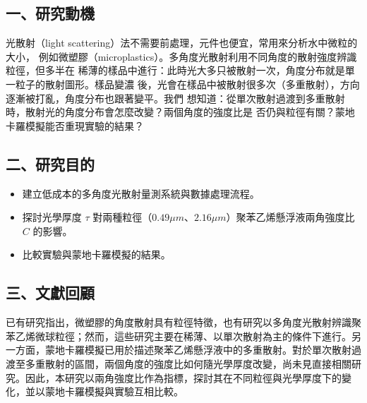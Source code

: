\subsection*{一、研究動機}
光散射（light scattering）法不需要前處理，元件也便宜，常用來分析水中微粒的大小，
例如微塑膠（microplastics）。多角度光散射利用不同角度的散射強度辨識粒徑，但多半在
稀薄的樣品中進行：此時光大多只被散射一次，角度分布就是單一粒子的散射圖形。樣品變濃
後，光會在樣品中被散射很多次（多重散射），方向逐漸被打亂，角度分布也跟著變平。我們
想知道：從單次散射過渡到多重散射時，散射光的角度分布會怎麼改變？兩個角度的強度比是
否仍與粒徑有關？蒙地卡羅模擬能否重現實驗的結果？

\subsection*{二、研究目的}
\begin{itemize}
    \item[(一)] 建立低成本的多角度光散射量測系統與數據處理流程。
    \item[(二)] 探討光學厚度 $\tau$ 對兩種粒徑（$0.49 \mu m$、$2.16 \mu m$）聚苯乙烯懸浮液兩角強度比 $C$ 的影響。
    \item[(三)] 比較實驗與蒙地卡羅模擬的結果。
\end{itemize}
\subsection*{三、文獻回顧}
已有研究指出，微塑膠的角度散射具有粒徑特徵\parencite{genc2023NumericalAnalysis}，也有研究以多角度光散射辨識聚苯乙烯微球粒徑\parencite{lotfiChoobbari2022BatchAnalysis}；然而，這些研究主要在稀薄、以單次散射為主的條件下進行。另一方面，蒙地卡羅模擬已用於描述聚苯乙烯懸浮液中的多重散射\parencite{berrocal2007LaserLightScattering}。對於單次散射過渡至多重散射的區間，兩個角度的強度比如何隨光學厚度改變，尚未見直接相關研究。因此，本研究以兩角強度比作為指標，探討其在不同粒徑與光學厚度下的變化，並以蒙地卡羅模擬與實驗互相比較。
